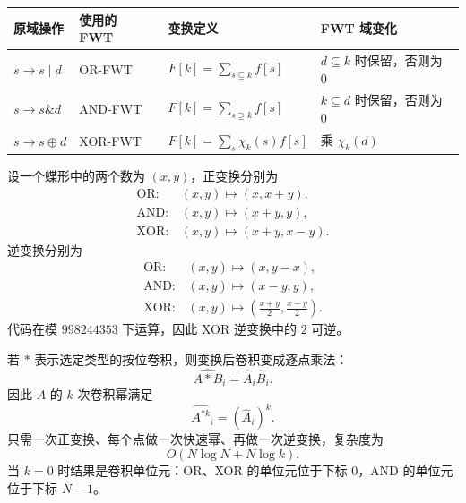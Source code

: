 \begin{center}
\scriptsize
\setlength{\tabcolsep}{2pt}
\renewcommand{\arraystretch}{1.2}
\begin{tabularx}{\linewidth}{@{}p{.17\linewidth}p{.15\linewidth}p{.36\linewidth}X@{}}
  \toprule
  原域操作 & 使用的 FWT & 变换定义 & FWT 域变化 \\
  \midrule
  $s\to s\mathbin{|}d$
    & OR-FWT
    & $F[k]=\sum_{s\subseteq k}f[s]$
    & $d\subseteq k$ 时保留，否则为 $0$ \\
  $s\to s\mathbin{\&}d$
    & AND-FWT
    & $F[k]=\sum_{s\supseteq k}f[s]$
    & $k\subseteq d$ 时保留，否则为 $0$ \\
  $s\to s\mathbin{\oplus}d$
    & XOR-FWT
    & $F[k]=\sum_s\chi_k(s)f[s]$
    & 乘 $\chi_k(d)$ \\
  \bottomrule
\end{tabularx}
\end{center}

设一个蝶形中的两个数为 $(x,y)$，正变换分别为
\[
\begin{aligned}
  \mathrm{OR}:  &(x,y)\mapsto(x,x+y),\\
  \mathrm{AND}: &(x,y)\mapsto(x+y,y),\\
  \mathrm{XOR}: &(x,y)\mapsto(x+y,x-y).
\end{aligned}
\]
逆变换分别为
\[
\begin{aligned}
  \mathrm{OR}:  &(x,y)\mapsto(x,y-x),\\
  \mathrm{AND}: &(x,y)\mapsto(x-y,y),\\
  \mathrm{XOR}: &(x,y)\mapsto
    \left(\frac{x+y}{2},\frac{x-y}{2}\right).
\end{aligned}
\]
代码在模 $998244353$ 下运算，因此 XOR 逆变换中的 $2$ 可逆。

若 $*$ 表示选定类型的按位卷积，则变换后卷积变成逐点乘法：
\[
  \widehat{A*B}_i=\widehat A_i\widehat B_i.
\]
因此 $A$ 的 $k$ 次卷积幂满足
\[
  \widehat{A^{*k}}_i=(\widehat A_i)^k.
\]
只需一次正变换、每个点做一次快速幂、再做一次逆变换，复杂度为
\[
  O(N\log N+N\log k).
\]
当 $k=0$ 时结果是卷积单位元：OR、XOR 的单位元位于下标 $0$，AND 的单位元位于下标 $N-1$。
